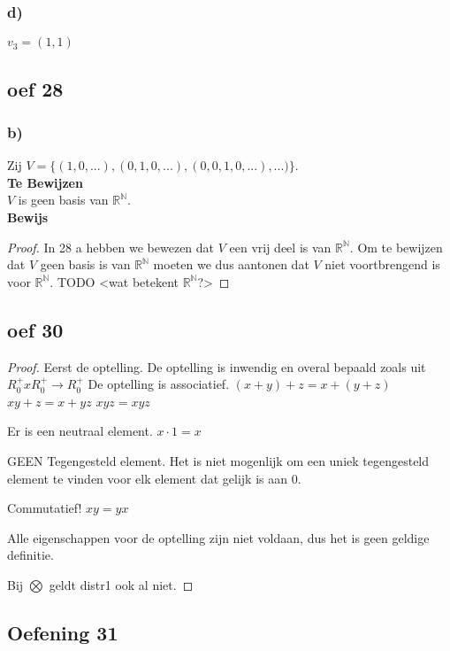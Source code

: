 \documentclass[lineaire_algebra_oplossingen.tex]{subfiles}
\begin{document}
\subsubsection*{d)}
$v_3 = (1,1)$

\subsection{oef 28}
\subsubsection*{b)}
Zij $V = \{(1,0,...),(0,1,0,...),(0,0,1,0,...),...)\}$.\\
\textbf{Te Bewijzen}\\
$V$ is geen basis van $\mathbb{R}^\mathbb{N}$.\\
\textbf{Bewijs}
\begin{proof}
In 28 a hebben we bewezen dat $V$ een vrij deel is van $\mathbb{R}^\mathbb{N}$. Om te bewijzen dat $V$ geen basis is van $\mathbb{R}^\mathbb{N}$ moeten we dus aantonen dat $V$ niet voortbrengend is voor $\mathbb{R}^\mathbb{N}$.
TODO <wat betekent $\mathbb{R}^\mathbb{N}$?>
\end{proof}

\subsection{oef 30}

\begin{proof}

Eerst de optelling.
De optelling is inwendig en overal bepaald zoals uit $R_{0}^{+} x R_{0}^{+} \rightarrow R_{0}^{+} $ 
De optelling is associatief.
$ (x + y) + z = x + (y+z) $
$ xy + z = x + yz$
$ xyz = xyz $

Er is een neutraal element.
$x \cdot 1 = x $

GEEN Tegengesteld element.
Het is niet mogenlijk om een uniek tegengesteld element te vinden voor elk element dat gelijk is aan 0.

Commutatief!
$xy = yx$

Alle eigenschappen voor de optelling zijn niet voldaan, dus het is geen geldige definitie.

Bij $ \bigotimes $ geldt distr1 ook al niet.

\end{proof}

\subsection{Oefening 31}
\end{document}
